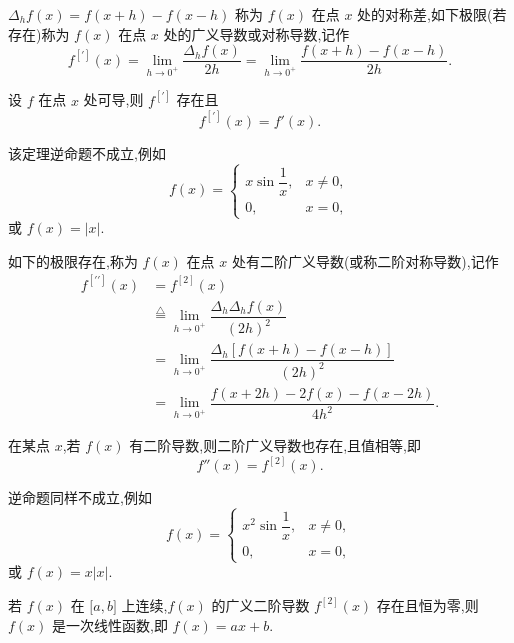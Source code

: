 \documentclass[../../数学分析培优讲义.tex]{subfiles}
\begin{document}
\begin{definition}
$\Delta_hf(x)=f(x+h)-f(x-h)$ 称为 $f(x)$ 在点 $x$ 处的对称差,如下极限(若存在)称为 $f(x)$ 在点 $x$ 处的广义导数或对称导数,记作
\[
    f^{[\prime]}(x)
    =\lim\limits_{h\to0^+}\dfrac{\Delta_hf(x)}{2h}
    =\lim\limits_{h\to0^+}\dfrac{f(x+h)-f(x-h)}{2h}.
\]
\end{definition}

\begin{theorem}[\markstar]
设 $f$ 在点 $x$ 处可导,则 $f^{[\prime]}$ 存在且
\[
    f^{[\prime]}(x)=f'(x).
\]
\end{theorem}

\begin{remark}
该定理逆命题不成立,例如
\[
f(x)=
\begin{cases}
    x\sin\dfrac{1}{x}, & x\neq0,\\
    0, & x=0,
\end{cases}
\]
或 $f(x)=|x|$.
\end{remark}

\begin{definition}
如下的极限存在,称为 $f(x)$ 在点 $x$ 处有二阶广义导数(或称二阶对称导数),记作
\[
\begin{aligned}
    f^{[\prime\prime]}(x)
    &=f^{[2]}(x)\\
    &\overset{\triangle}{=}
    \lim\limits_{h\to0^+}\dfrac{\Delta_h\Delta_hf(x)}{(2h)^2}\\
    &=\lim\limits_{h\to0^+}
    \dfrac{\Delta_h[f(x+h)-f(x-h)]}{(2h)^2}\\
    &=\lim\limits_{h\to0^+}
    \dfrac{f(x+2h)-2f(x)-f(x-2h)}{4h^2}.
\end{aligned}
\]
\end{definition}

\begin{theorem}[\markstar]
在某点 $x$,若 $f(x)$ 有二阶导数,则二阶广义导数也存在,且值相等,即
\[
    f''(x)=f^{[2]}(x).
\]
\end{theorem}

\begin{remark}
逆命题同样不成立,例如
\[
f(x)=
\begin{cases}
    x^2\sin\dfrac{1}{x}, & x\neq0,\\
    0, & x=0,
\end{cases}
\]
或 $f(x)=x|x|$.
\end{remark}

\begin{example}
若 $f(x)$ 在 $\lbrack a,b\rbrack$ 上连续,$f(x)$ 的广义二阶导数 $f^{[2]}(x)$ 存在且恒为零,则 $f(x)$ 是一次线性函数,即 $f(x)=ax+b$.
\end{example}
\exampleblank
\end{document}

